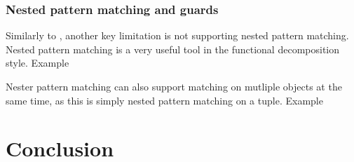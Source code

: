 \documentclass[ oneside,%
                    author={James Elgar},
                    degree={MEng},
                     title={Bidirectional transformer between functional and \\ object-oriented programming in Rust},
                  subtitle={}]{dissertation}
\begin{document}
\subsection{Nested pattern matching and guards}

Similarly to \cite{food}, another key limitation is not supporting nested pattern matching. Nested pattern matching is a very useful tool in the functional decomposition style. Example

Nester pattern matching can also support matching on mutliple objects at the same time, as this is simply nested pattern matching on a tuple. Example 







\chapter{Conclusion}
\label{chap:conclusion}
\end{document}
